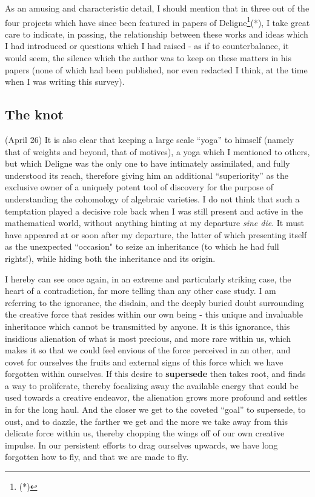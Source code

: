As an amusing and characteristic detail, I should mention that in three out of the four projects which
have since been featured in papers of Deligne\footnote{(*)}(*), I take great care to indicate, in passing,
the relationship between these works and ideas which I had introduced or questions which I had
raised - as if to counterbalance, it would seem, the silence which the author was to keep on these
matters in his papers (none of which had been published, nor even redacted I think, at the time when I
was writing this survey).

\subsection{The knot}

 (April 26) 
It is also clear that keeping a large scale ``yoga'' to himself (namely that of
weights and beyond, that of motives), a yoga which I mentioned to others, but which
Deligne was the only one to have intimately assimilated, and fully understood its reach, 
therefore giving him an additional ``superiority'' as the exclusive owner of a uniquely
potent tool of discovery for the purpose of understanding the
cohomology of algebraic varieties.
I do not think that such a temptation played a decisive role back when I was still present
and active in the mathematical world, without anything hinting at my departure
\textit{sine die}. It must have appeared at or soon after my departure,
the latter of which presenting itself as the unexpected ``occasion"
to seize an inheritance (to which he had full rights!), while hiding both the inheritance
and its origin. 

I hereby can see once again, in an extreme and particularly striking case, 
the heart of a contradiction, far more telling than any other case study. 
I am referring to the ignorance, the disdain, and the deeply buried doubt surrounding the
creative force that resides within our own being - this unique and invaluable inheritance
which cannot be transmitted by anyone.
It is this ignorance, this insidious alienation
of what is most precious, and more rare within us, which makes it so 
that we could feel envious of the force perceived in an other, and covet for ourselves the
fruits and external signs of this force which we have forgotten within ourselves.
If this desire to \textbf{supersede} then takes root, and finds a way to proliferate, 
thereby focalizing away the available energy that could be used towards a creative
endeavor, the alienation grows more profound and settles in for the long haul. 
And the closer we get to the coveted ``goal'' to supersede, to oust, and to dazzle, the
farther we get and the more we take away from this delicate force within us, thereby
chopping the wings off of our own creative impulse. 
In our persistent efforts to drag ourselves upwards, we have long forgotten how to fly,
and that we are made to fly.

